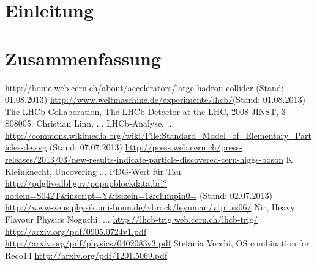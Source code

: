 \documentclass[a4paper]{scrbook}
\begin{document}

\tableofcontents

\chapter{Einleitung}


%
%
%
%

\chapter{Zusammenfassung}

\begin{thebibliography}{---}
 \url{http://home.web.cern.ch/about/accelerators/large-hadron-collider} (Stand: 01.08.2013)
 \url{http://www.weltmaschine.de/experimente/lhcb/}(Stand: 01.08.2013)
 The LHCb Collaboration, The LHCb Detector at the LHC, 2008 JINST, 3 S08005.
 Christian Linn, ...
 LHCb-Analyse, ...
 \url{http://commons.wikimedia.org/wiki/File:Standard_Model_of_Elementary_Particles-de.svg} (Stand: 07.07.2013)
 \url{http://press.web.cern.ch/press-releases/2013/03/new-results-indicate-particle-discovered-cern-higgs-boson}
  K. Kleinknecht, Uncovering ...
 PDG-Wert für Tau \\ \url{http://pdglive.lbl.gov/popupblockdata.brl?nodein=S042T&inscript=Y&fsizein=1&clumpin0=} (Stand: 02.07.2013)
 \url{http://www-zeus.physik.uni-bonn.de/~brock/feynman/vtp_ss06/}
 Nir, Heavy Flavour Physics
 Noguchi, ...
 \url{http://lhcb-trig.web.cern.ch/lhcb-trig/}
 \url{http://arxiv.org/pdf/0905.0724v1.pdf}
 \url{http://arxiv.org/pdf/physics/0402083v3.pdf}
 Stefania Vecchi, OS combination for Reco14
 \url{http://arxiv.org/pdf/1201.5069.pdf}
\end{thebibliography}



\end{document}
